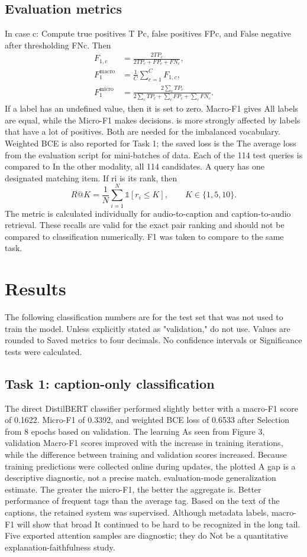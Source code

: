 \documentclass[10pt,twocolumn,letterpaper]{article}
\begin{document}
\subsection{Evaluation metrics}
In case c: Compute true positives T Pc, false positives FPc, and False negative after thresholding FNc. Then
\begin{align}
F_{1,c}&=\frac{2TP_c}{2TP_c+FP_c+FN_c},\\
F_1^{\mathrm{macro}}&=\frac{1}{C}\sum_{c=1}^{C}F_{1,c},\\
F_1^{\mathrm{micro}}&=\frac{2\sum_cTP_c}{2\sum_cTP_c+\sum_cFP_c+\sum_cFN_c}.
\label{eq:f1}
\end{align}
If a label has an undefined value, then it is set to zero. Macro-F1 gives All labels are equal, while the Micro-F1 makes decisions. is more strongly affected by labels that have a lot of positives. Both are needed for the imbalanced vocabulary. Weighted BCE is also reported for Task 1; the saved loss is the The average loss from the evaluation script for mini-batches of data. Each of the 114 test queries is compared to In the other modality, all 114 candidates. A query has one designated matching item. If ri is its rank, then
\begin{equation}
R@K=\frac{1}{N}\sum_{i=1}^{N}\mathbb{1}[r_i\leq K],
\qquad K\in\{1,5,10\}.
\label{eq:recall}
\end{equation}
The metric is calculated individually for audio-to-caption and caption-to-audio retrieval. These recalls are valid for the exact pair ranking and should not be compared to classification numerically. F1 was taken to compare to the same task.

\section{Results}
The following classification numbers are for the test set that was not used to train the model. Unless explicitly stated as "validation," do not use. Values are rounded to Saved metrics to four decimals. No confidence intervals or Significance tests were calculated.

\subsection{Task 1: caption-only classification}
The direct DistilBERT classifier performed slightly better with a macro-F1 score of 0.1622. Micro-F1 of 0.3392, and weighted BCE loss of 0.6533 after Selection from 8 epochs based on validation. The learning As seen from Figure 3, validation Macro-F1 scores improved with the increase in training iterations, while the difference between training and validation scores increased. Because training predictions were collected online during updates, the plotted A gap is a descriptive diagnostic, not a precise match. evaluation-mode generalization estimate. The greater the micro-F1, the better the aggregate is. Better performance of frequent tags than the average tag. Based on the text of the captions, the retained system was supervised. Although metadata labels, macro-F1 will show that broad It continued to be hard to be recognized in the long tail. Five exported attention samples are diagnostic; they do Not be a quantitative explanation-faithfulness study.
\end{document}
